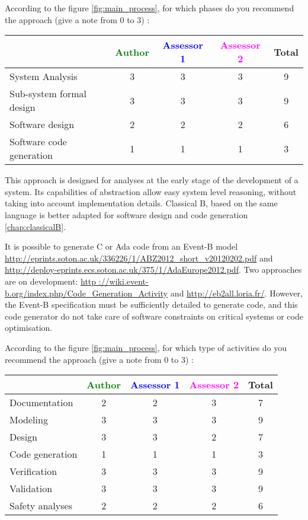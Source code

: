 According to the figure \ref{fig:main_process}, for which phases do you recommend the approach (give a note from 0 to  3) :

\begin{tabular}{|l | c | c | c | c|}
\hline
& \textcolor{green}{Author} & \textcolor{blue}{Assessor 1} & \textcolor{magenta}{Assessor 2} & Total \\
\hline 
System Analysis & 3 & 3 & 3 & 9 \\
\hline
Sub-system formal design & 3 & 3 & 3 & 9 \\
\hline
Software design & 2 & 2 & 2 & 6 \\
\hline
Software code generation & 1 & 1 & 1 & 3 \\
\hline
\end{tabular}

\begin{author_comment}
This approach is designed for analyses at the early stage of the development of a system. Its capabilities of abstraction allow easy system level reasoning, without taking into account implementation details. Classical B, based on the same language is better adapted for software design and code generation \ref{chap:classicalB}.

It is possible to generate C or Ada code from an Event-B model \url{http://eprints.soton.ac.uk/336226/1/ABZ2012_short_v20120202.pdf} and \url{http://deploy-eprints.ecs.soton.ac.uk/375/1/AdaEurope2012.pdf}. Two  approaches are on development: \url{http ://wiki.event-b.org/index.php/Code_Generation_Activity} and \url{http://eb2all.loria.fr/}. However, the Event-B specification must be sufficiently detailed to generate code, and this code generator do not take care of software constraints on critical systems or code optimisation.
\end{author_comment}


According to the figure \ref{fig:main_process}, for which type of activities do you recommend the approach (give a note from 0 to  3) :

\begin{tabular}{|l | c | c | c | c|}
\hline
& \textcolor{green}{Author} & \textcolor{blue}{Assessor 1} & \textcolor{magenta}{Assessor 2} & Total \\
\hline 
Documentation & 2 & 2 & 3 & 7 \\
\hline
Modeling & 3 & 3 & 3 & 9 \\
\hline
Design & 3 & 3 & 2 & 7 \\
\hline
Code generation & 1 & 1 & 1 & 3 \\
\hline
Verification & 3 & 3 & 3 & 9 \\
\hline
Validation & 3 & 3 & 3 & 9 \\
\hline
Safety analyses & 2 & 2 & 2 & 6 \\
\hline
\end{tabular}

